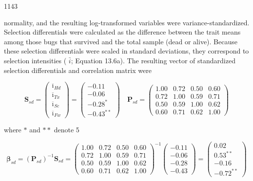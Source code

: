 \documentclass{article}
\begin{document}
1143

normality, and the resulting log-transformed variables were variance-standardized. Selection differentials were calculated as the difference between the trait means among those bugs that survived and the total sample (dead or alive). Because these selection differentials were scaled in standard deviations, they correspond to selection intensities ( $ \bar{i} $; Equation 13.6a). The resulting vector of standardized selection differentials and correlation matrix were

\begin{equation}
\mathbf{S}_{sd}=\begin{pmatrix}\overline{\imath}_{Hd}\\\overline{\imath}_{Tx}\\\overline{\imath}_{Sc}\\\overline{\imath}_{Fw}\end{pmatrix}=\begin{pmatrix}-0.11\\-0.06\\-0.28^{*}\\-0.43^{**}\end{pmatrix}\quad\mathbf{P}_{sd}=\begin{pmatrix}1.00&0.72&0.50&0.60\\0.72&1.00&0.59&0.71\\0.50&0.59&1.00&0.62\\0.60&0.71&0.62&1.00\end{pmatrix}
\end{equation}

where  $ * $ and  $ ** $ denote 5%

\begin{equation}
\boldsymbol{\beta}_{s d}=(\mathbf{P}_{s d})^{-1}\mathbf{S}_{s d}=\begin{pmatrix}1.00&0.72&0.50&0.60\\0.72&1.00&0.59&0.71\\0.50&0.59&1.00&0.62\\0.60&0.71&0.62&1.00\end{pmatrix}^{-1}\begin{pmatrix}-0.11\\-0.06\\-0.28\\-0.43\end{pmatrix}=\begin{pmatrix}0.02\\0.53^{**}\\-0.16\\-0.72^{**}\end{pmatrix}
\end{equation}
\end{document}
